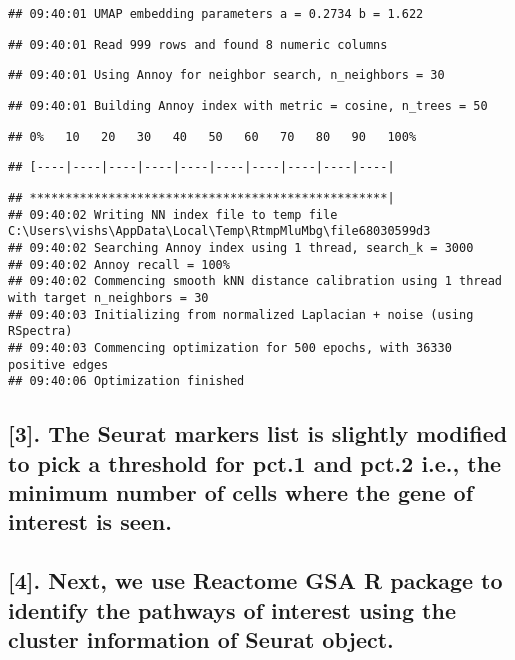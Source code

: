 \documentclass[
]{article}
\begin{document}
\begin{verbatim}
## 09:40:01 UMAP embedding parameters a = 0.2734 b = 1.622
\end{verbatim}

\begin{verbatim}
## 09:40:01 Read 999 rows and found 8 numeric columns
\end{verbatim}

\begin{verbatim}
## 09:40:01 Using Annoy for neighbor search, n_neighbors = 30
\end{verbatim}

\begin{verbatim}
## 09:40:01 Building Annoy index with metric = cosine, n_trees = 50
\end{verbatim}

\begin{verbatim}
## 0%   10   20   30   40   50   60   70   80   90   100%
\end{verbatim}

\begin{verbatim}
## [----|----|----|----|----|----|----|----|----|----|
\end{verbatim}

\begin{verbatim}
## **************************************************|
## 09:40:02 Writing NN index file to temp file C:\Users\vishs\AppData\Local\Temp\RtmpMluMbg\file68030599d3
## 09:40:02 Searching Annoy index using 1 thread, search_k = 3000
## 09:40:02 Annoy recall = 100%
## 09:40:02 Commencing smooth kNN distance calibration using 1 thread with target n_neighbors = 30
## 09:40:03 Initializing from normalized Laplacian + noise (using RSpectra)
## 09:40:03 Commencing optimization for 500 epochs, with 36330 positive edges
## 09:40:06 Optimization finished
\end{verbatim}

\subsection{{[}3{]}. The Seurat markers list is slightly modified to
pick a threshold for pct.1 and pct.2 i.e., the minimum number of cells
where the gene of interest is
seen.}\label{the-seurat-markers-list-is-slightly-modified-to-pick-a-threshold-for-pct.1-and-pct.2-i.e.-the-minimum-number-of-cells-where-the-gene-of-interest-is-seen.}

\subsection{{[}4{]}. Next, we use Reactome GSA R package to identify the
pathways of interest using the cluster information of Seurat
object.}\label{next-we-use-reactome-gsa-r-package-to-identify-the-pathways-of-interest-using-the-cluster-information-of-seurat-object.}
\end{document}
